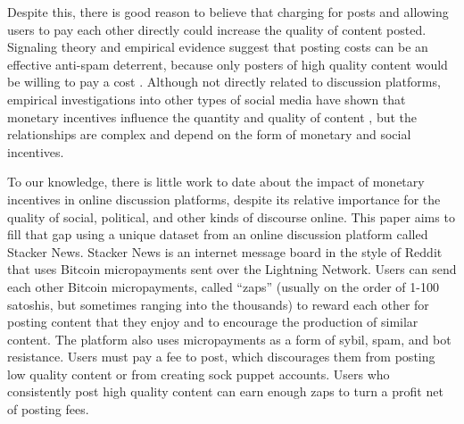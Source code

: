 Despite this, there is good reason to believe that charging for posts and allowing users to pay each other directly could increase the quality of content posted. Signaling theory and empirical evidence suggest that posting costs can be an effective anti-spam deterrent, because only posters of high quality content would be willing to pay a cost \citep{joseph2008email, tchernichovski2019pnas}. Although not directly related to discussion platforms, empirical investigations into other types of social media have shown that monetary incentives influence the quantity and quality of content \citep{chen2010google, sun2013blogs, burtch2017ms, elkomboz2023youtube, kerkhof2024youtube}, but the relationships are complex and depend on the form of monetary and social incentives.

To our knowledge, there is little work to date about the impact of monetary incentives in online discussion platforms, despite its relative importance for the quality of social, political, and other kinds of discourse online. This paper aims to fill that gap using a unique dataset from an online discussion platform called Stacker News. Stacker News is an internet message board in the style of Reddit that uses Bitcoin micropayments sent over the Lightning Network. Users can send each other Bitcoin micropayments, called ``zaps'' (usually on the order of 1-100 satoshis, but sometimes ranging into the thousands) to reward each other for posting content that they enjoy and to encourage the production of similar content. The platform also uses micropayments as a form of sybil, spam, and bot resistance. Users must pay a fee to post, which discourages them from posting low quality content or from creating sock puppet accounts. Users who consistently post high quality content can earn enough zaps to turn a profit net of posting fees. 

